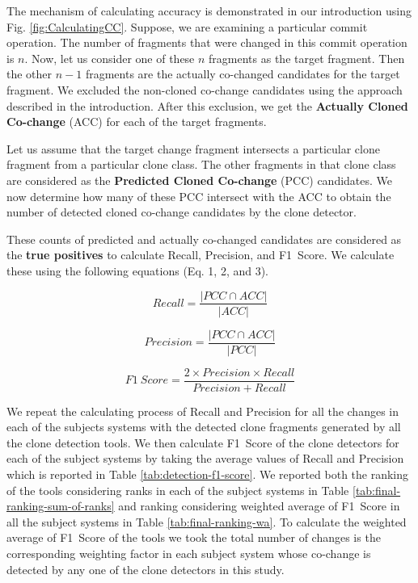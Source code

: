 \documentclass[review]{elsarticle}
\begin{document}
The mechanism of calculating accuracy is demonstrated in our introduction using Fig. \ref{fig:CalculatingCC}. Suppose, we are examining a particular commit operation. The number of fragments that were changed in this commit operation is $n$. Now, let us consider one of these $n$ fragments as the target fragment. Then the other $n-1$ fragments are the actually co-changed candidates for the target fragment. We excluded the non-cloned co-change candidates using the approach described in the introduction. After this exclusion, we get the \textbf{Actually Cloned Co-change} (ACC) for each of the target fragments. 

Let us assume that the target change fragment intersects a particular clone fragment from a particular clone class. The other fragments in that clone class are considered as the \textbf{Predicted Cloned Co-change} (PCC) candidates. We now determine how many of these PCC intersect with the ACC to obtain the number of detected cloned co-change candidates by the clone detector. 

These counts of predicted and actually co-changed candidates are considered as the \textbf{true positives} to calculate Recall, Precision, and F1~Score. We calculate these using the following equations (Eq. 1, 2, and 3).

\begin{equation}
    Recall = \frac{|PCC \cap ACC|}{|ACC|}
\end{equation}

\begin{equation}
    Precision = \frac{|PCC \cap ACC|}{|PCC|}
\end{equation}

\begin{equation}
    F1~Score = \frac{2 \times Precision \times Recall}{Precision + Recall}
\end{equation}

\vspace{1mm}
We repeat the calculating process of Recall and Precision for all the changes in each of the subjects systems with the detected clone fragments generated by all the clone detection tools. We then calculate F1~Score of the clone detectors for each of the subject systems by taking the average values of Recall and Precision which is reported in Table \ref{tab:detection-f1-score}. We reported both the ranking of the tools considering ranks in each of the subject systems in Table \ref{tab:final-ranking-sum-of-ranks} and ranking considering weighted average of F1~Score in all the subject systems in Table \ref{tab:final-ranking-wa}. To calculate the weighted average of F1~Score of the tools we took the total number of changes is the corresponding weighting factor in each subject system whose co-change is detected by any one of the clone detectors in this study.
\end{document}
